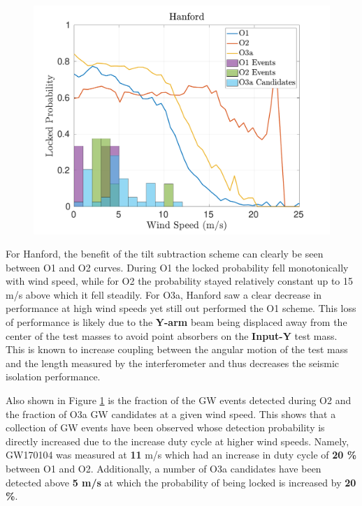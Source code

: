 \documentclass [12pt, proquest]{uwthesis}[2019]
\begin{document}
\begin{figure}%
\begin{center}
\includegraphics[width=\textwidth]{LHO_WindVsLockEvents.pdf}
\caption{}
\label{LHO_events}
\end{center}
\end{figure}

For Hanford, the benefit of the tilt subtraction scheme can clearly be seen between O1 and O2 curves. During O1 the locked probability fell monotonically with wind speed, while for O2 the probability stayed relatively constant up to 15 m/s above which it fell steadily. For O3a, Hanford saw a clear decrease in performance at high wind speeds yet still out performed the O1 scheme. This loss of performance is likely due to the \textbf{Y-arm} beam being displaced away from the center of the test masses to avoid point absorbers on the \textbf{Input-Y} test mass. This is known to increase coupling between the angular motion of the test mass and the length measured by the interferometer and thus decreases the seismic isolation performance. 

Also shown in Figure \ref{LHO_events} is the fraction of the GW events detected during O2 and the fraction of O3a GW candidates at a given wind speed. This shows that a collection of GW events have been observed whose detection probability is directly increased due to the increase duty cycle at higher wind speeds. Namely, GW170104 was measured at \textbf{11} m/s which had an increase in duty cycle of \textbf{20 \%} between O1 and O2. Additionally, a number of O3a candidates have been detected above \textbf{5 m/s} at which the probability of being locked is increased by \textbf{20 \%}.
\end{document}
